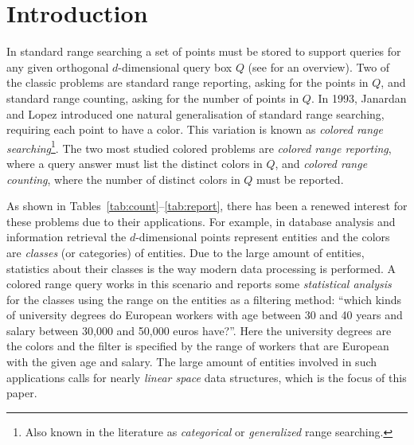 \section{Introduction}
\label{sec:crc-introduction}
%
In standard range searching a set of points must be stored to support queries for any given orthogonal $d$-dimensional query box $Q$ (see \cite{de2008orthogonal} for an overview). Two of the classic problems are standard range reporting, asking for the points in $Q$, and standard range counting, asking for the number of points in $Q$. In 1993, Janardan and Lopez \cite{janardan1993generalized} introduced one natural generalisation of standard range searching, requiring each point to have a color. This variation is known as \emph{colored range searching}\footnote{Also known in the literature as \emph{categorical} or \emph{generalized} range searching.}. 
The two most studied colored problems are \emph{colored range reporting}, where a query answer must list the distinct colors in $Q$, and \emph{colored range counting}, where the number of distinct colors in $Q$ must be reported. 

As shown in Tables~\ref{tab:count}--\ref{tab:report}, there has been a renewed interest for these problems due to their applications. For example, in database analysis and information retrieval the $d$-dimensional points represent entities and the colors are \emph{classes} (or categories) of entities. Due to the large amount of entities, statistics about their classes is the way modern data processing is performed.  A colored range query works in this scenario and reports some \emph{statistical analysis} for the classes using the range on the entities as a filtering method: ``which kinds of university degrees do European workers with age between 30 and 40 years and salary between 30,000 and 50,000 euros have?''. Here the university degrees are the colors and the filter is specified by the range of workers that are European with the given age and salary. The large amount of entities involved in such applications calls for nearly \emph{linear space} data structures, which is the focus of this paper.

